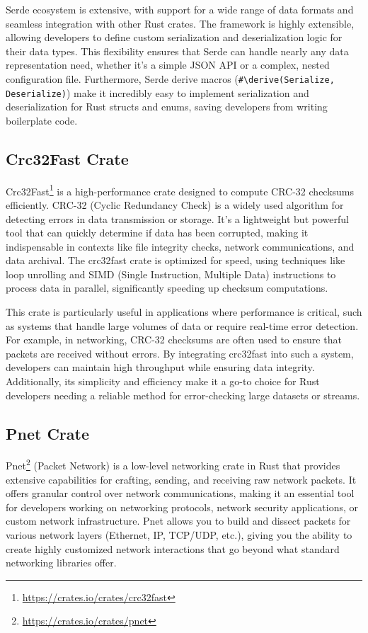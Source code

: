 Serde ecosystem is extensive, with support for a wide range of data formats and seamless integration with other Rust crates. The framework is highly extensible, allowing developers to define custom serialization and deserialization logic for their data types. This flexibility ensures that Serde can handle nearly any data representation need, whether it's a simple JSON API or a complex, nested configuration file. Furthermore, Serde derive macros (\texttt{\#\textbackslash{}derive(Serialize, Deserialize)}) make it incredibly easy to implement serialization and deserialization for Rust structs and enums, saving developers from writing boilerplate code.

\subsection{Crc32Fast Crate}

Crc32Fast\footnote{\url{https://crates.io/crates/crc32fast}} is a high-performance crate designed to compute CRC-32 checksums efficiently. CRC-32 (Cyclic Redundancy Check) is a widely used algorithm for detecting errors in data transmission or storage. It’s a lightweight but powerful tool that can quickly determine if data has been corrupted, making it indispensable in contexts like file integrity checks, network communications, and data archival. The crc32fast crate is optimized for speed, using techniques like loop unrolling and SIMD (Single Instruction, Multiple Data) instructions to process data in parallel, significantly speeding up checksum computations.

This crate is particularly useful in applications where performance is critical, such as systems that handle large volumes of data or require real-time error detection. For example, in networking, CRC-32 checksums are often used to ensure that packets are received without errors. By integrating crc32fast into such a system, developers can maintain high throughput while ensuring data integrity. Additionally, its simplicity and efficiency make it a go-to choice for Rust developers needing a reliable method for error-checking large datasets or streams.

\subsection{Pnet Crate}

Pnet\footnote{\url{https://crates.io/crates/pnet}} (Packet Network) is a low-level networking crate in Rust that provides extensive capabilities for crafting, sending, and receiving raw network packets. It offers granular control over network communications, making it an essential tool for developers working on networking protocols, network security applications, or custom network infrastructure. Pnet allows you to build and dissect packets for various network layers (Ethernet, IP, TCP/UDP, etc.), giving you the ability to create highly customized network interactions that go beyond what standard networking libraries offer.

